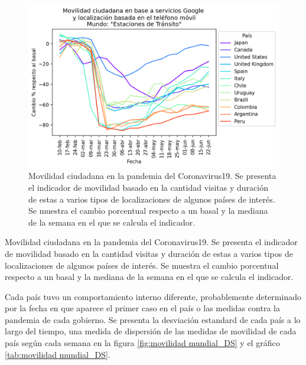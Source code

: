 \documentclass{article}
\begin{document}
\begin{figure}[H]
	\centering
	\begin{adjustbox}{width=0.8\textwidth}
			\includegraphics{./figtab/mundo_media.png} %
	\end{adjustbox}
	\caption{Movilidad ciudadana en la pandemia del Coronavirus19. Se presenta el indicador de movilidad basado en la cantidad visitas y duración de estas a varios tipos de localizaciones de algunos países de interés. Se muestra el cambio porcentual respecto a un basal y la mediana de la semana en el que se calcula el indicador. }
	\label{fig:movilidad mundial}
\end{figure}


\begin{table}[H]
	\begin{adjustbox}{width=1\textwidth}
	\end{adjustbox}
	\caption{Movilidad ciudadana en la pandemia del Coronavirus19. Se presenta el indicador de movilidad basado en la cantidad visitas y duración de estas a varios tipos de localizaciones de algunos países de interés. Se muestra el cambio porcentual respecto a un basal y la mediana de la semana en el que se calcula el indicador. }
\label{tab:movilidad mundial}
\end{table}


Cada país tuvo un comportamiento interno diferente, probablemente determinado por la fecha en que aparece el primer caso en el país o las medidas contra la pandemia de cada gobierno. Se presenta la desviación estandard de cada país a lo largo del tiempo, una medida de dispersión de las medidas de movilidad de cada país según cada semana en la figura \ref{fig:movilidad mundial_DS} y el gráfico \ref{tab:movilidad mundial_DS}.
\end{document}
